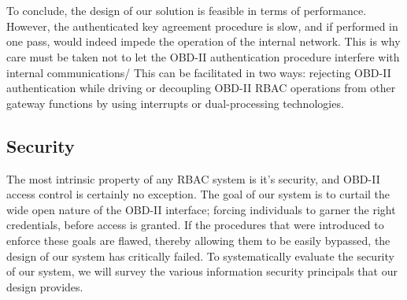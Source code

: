 \\ \\ To conclude, the design of our solution is feasible in terms of performance. However, the authenticated key agreement procedure is slow, and if performed in one pass, would indeed impede the operation of the internal network. This is why care must be taken not to let the OBD-II authentication procedure interfere with internal communications/ This can be facilitated in two ways: rejecting OBD-II authentication while driving or decoupling OBD-II RBAC operations from other gateway functions by using interrupts or dual-processing technologies. 


\subsection{Security}
\label{sec:security}

The most intrinsic property of any RBAC system is it's security, and OBD-II access control is certainly no exception. The goal of our system is to curtail the wide open nature of the OBD-II interface; forcing individuals to garner the right credentials, before access is granted. If the procedures that were introduced to enforce these goals are flawed, thereby allowing them to be easily bypassed, the design of our system has critically failed. To systematically evaluate the security of our system, we will survey the various information security principals that our design provides.

